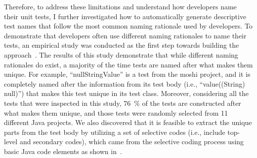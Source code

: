 Therefore, to address these limitations and understand how developers name their unit tests, I further investigated how to automatically generate descriptive test names that follow the most common naming rationale used by developers.
%
To demonstrate that developers often use different naming rationales to name their tests, an empirical study was conducted as the first step towards building the approach~\cite{emp-study}.
%
The results of this study demonstrate that while different naming rationales do exist, a majority of the time tests are named after what makes them unique.
For example, \enquote{nullStringValue} is a test from the moshi project, and it is completely named after the information from its test body (i.e., \enquote{value((String) null)}) that makes this test unique in its test class.
%
Moreover, considering all the tests that were inspected in this study, \SI{76}{\percent} of the tests are constructed after what makes them unique, and those tests were randomly selected from \num{11} different Java projects.
%
We also discovered that it is feasible to extract the unique parts from the test body by utilizing a set of selective codes (i.e., include top-level and secondary codes), which came from the selective coding process using basic Java code elements as shown in~\cite{emp-study}.


